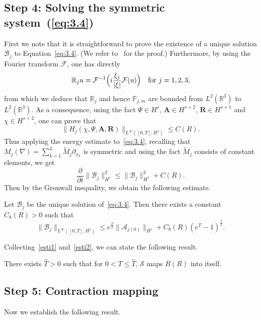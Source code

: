 \documentclass[AHL,Unicode,longabstracts]{cedram}
\newcommand{\BA}{\mathbf{A}}
\newcommand{\BR}{\mathbf{R}}
\newcommand{\R}{\mathbb{R}}
\begin{document}
\subsection*{Step 4: Solving the symmetric system~(\ref{eq:3.4})}

First we note that it is straightforward to prove the existence of a unique solution $\mathcal{B}_j$ to Equation~\eqref{eq:3.4}. (We refer to~\cite[Proposition~1.2, p.~115]{AG} for the proof.) Furthermore, by using the Fourier transform $\mathcal{F}$, one has directly
\[
\mathbb{R}_j u =\mathcal{F}^{-1}\Big(i\frac{\xi_j}{|\xi |} \mathcal{F}(u)\Big)
\quad \hbox{for} \ j=1,2,3,
\]
from which we deduce that $\mathbb{R}_j$ and hence $\mathbb{P}_{j,m}$ are bounded from $L^2(\R^3)$ to $L^2(\R^3)$. As a consequence, using the fact $\Psi \in H^s$, $\BA \in H^{s+2}$, $\BR \in H^{s+1}$ and $\chi \in H^{s+2}$, one can prove that
\[
\| H_j(\chi, \Psi, \BA, \BR) \|_{L^{\infty}([0,T];H^s)} \le C(R).
\]
Thus applying the energy estimate to~\eqref{eq:3.4}, recalling that $M_j(\nabla)= \sum_{k=1}^3 \widetilde{M}_j \partial_{x_k}$ is symmetric and using the fact $\widetilde{M}_j$ consists of constant elements, we get
\[
\frac{\partial}{\partial t} \| \mathcal{B}_j \|_{H^s}^2
\le \| \mathcal{B}_j \|_{H^s}^2 +C(R).
\]
Then by the Gronwall inequality, we obtain the following estimate.

\begin{lemm}\label{hyper}
Let $\mathcal{B}_j$ be the unique solution of~\eqref{eq:3.4}. Then there exists a constant $C_8(R)>0$ such that
\begin{equation}\label{esti2}
\| \mathcal{B}_j \|_{L^{\infty}([0,T];H^s)}
\le e^{\frac{T}{2}} \| \mathcal{A}_{j(0)} \|_{H^s} +C_8(R) (e^T-1)^{\frac{1}{2}}.
\end{equation}
\end{lemm}

Collecting~\eqref{esti1} and~\eqref{esti2}, we can state the following result.

\begin{prop}\label{prop1}
There exists $\hat{T}>0$ such that for $0<T\leq \hat{T}$, $\mathcal{S}$ maps $B(R)$ into itself.
\end{prop}

\subsection*{Step 5: Contraction mapping}

Now we establish the following result.
\end{document}
